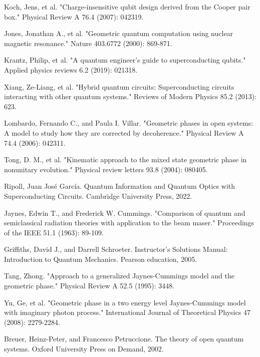 \begin{thebibliography}{9}
Koch, Jens, et al. "Charge-insensitive qubit design derived from the Cooper pair box." Physical Review A 76.4 (2007): 042319.

 Jones, Jonathan A., et al. "Geometric quantum computation using nuclear magnetic resonance." Nature 403.6772 (2000): 869-871.

 Krantz, Philip, et al. "A quantum engineer's guide to superconducting qubits." Applied physics reviews 6.2 (2019): 021318.

Xiang, Ze-Liang, et al. "Hybrid quantum circuits: Superconducting circuits interacting with other quantum systems." Reviews of Modern Physics 85.2 (2013): 623. 

 Lombardo, Fernando C., and Paula I. Villar. "Geometric phases in open systems: A model to study how they are corrected by decoherence." Physical Review A 74.4 (2006): 042311.

Tong, D. M., et al. "Kinematic approach to the mixed state geometric phase in nonunitary evolution." Physical review letters 93.8 (2004): 080405. 

Ripoll, Juan José García. Quantum Information and Quantum Optics with Superconducting Circuits. Cambridge University Press, 2022.

 Jaynes, Edwin T., and Frederick W. Cummings. "Comparison of quantum and semiclassical radiation theories with application to the beam maser." Proceedings of the IEEE 51.1 (1963): 89-109.

Griffiths, David J., and Darrell Schroeter. Instructor's Solutions Manual: Introduction to Quantum Mechanics. Pearson education, 2005.

 Tang, Zhong. "Approach to a generalized Jaynes-Cummings model and the geometric phase." Physical Review A 52.5 (1995): 3448.

 Yu, Ge, et al. "Geometric phase in a two energy level Jaynes-Cummings model with imaginary photon process." International Journal of Theoretical Physics 47 (2008): 2279-2284.

 Breuer, Heinz-Peter, and Francesco Petruccione. The theory of open quantum systems. Oxford University Press on Demand, 2002.


%

\end{thebibliography}
